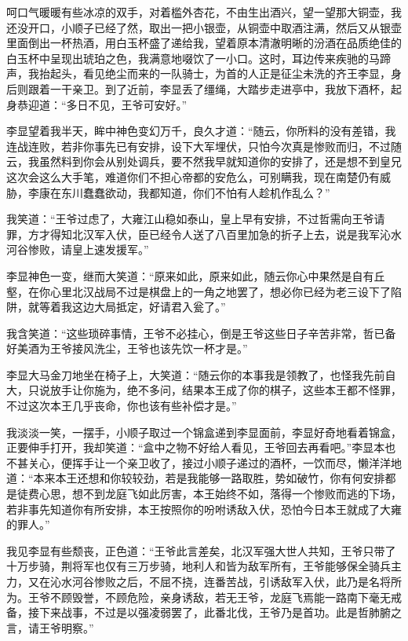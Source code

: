 呵口气暖暖有些冰凉的双手，对着槛外杏花，不由生出酒兴，望一望那大铜壶，我还没开口，小顺子已经了然，取出一把小银壶，从铜壶中取酒注满，然后又从银壶里面倒出一杯热酒，用白玉杯盛了递给我，望着原本清澈明晰的汾酒在品质绝佳的白玉杯中呈现出琥珀之色，我满意地啜饮了一小口。这时，耳边传来疾驰的马蹄声，我抬起头，看见绝尘而来的一队骑士，为首的人正是征尘未洗的齐王李显，身后则跟着一干亲卫。到了近前，李显丢了缰绳，大踏步走进亭中，我放下酒杯，起身恭迎道：“多日不见，王爷可安好。”

李显望着我半天，眸中神色变幻万千，良久才道：“随云，你所料的没有差错，我连战连败，若非你事先已有安排，设下大军埋伏，只怕今次真是惨败而归，不过随云，我虽然料到你会从别处调兵，要不然我早就知道你的安排了，还是想不到皇兄这次会这么大手笔，难道你们不担心帝都的安危么，可别瞒我，现在南楚仍有威胁，李康在东川蠢蠢欲动，我都知道，你们不怕有人趁机作乱么？”

我笑道：“王爷过虑了，大雍江山稳如泰山，皇上早有安排，不过哲需向王爷请罪，方才得知北汉军入伏，臣已经令人送了八百里加急的折子上去，说是我军沁水河谷惨败，请皇上速发援军。”

李显神色一变，继而大笑道：“原来如此，原来如此，随云你心中果然是自有丘壑，在你心里北汉战局不过是棋盘上的一角之地罢了，想必你已经为老三设下了陷阱，就等着我这边大局抵定，好请君入瓮了。”

我含笑道：“这些琐碎事情，王爷不必挂心，倒是王爷这些日子辛苦非常，哲已备好美酒为王爷接风洗尘，王爷也该先饮一杯才是。”

李显大马金刀地坐在椅子上，大笑道：“随云你的本事我是领教了，也怪我先前自大，只说放手让你施为，绝不多问，结果本王成了你的棋子，这些本王都不怪罪，不过这次本王几乎丧命，你也该有些补偿才是。”

我淡淡一笑，一摆手，小顺子取过一个锦盒递到李显面前，李显好奇地看着锦盒，正要伸手打开，我却笑道：“盒中之物不好给人看见，王爷回去再看吧。”李显本也不甚关心，便挥手让一个亲卫收了，接过小顺子递过的酒杯，一饮而尽，懒洋洋地道：“本来本王还想和你较较劲，若是我能够一路取胜，势如破竹，你有何安排都是徒费心思，想不到龙庭飞如此厉害，本王始终不如，落得一个惨败而逃的下场，若非事先知道你有所安排，本王按照你的吩咐诱敌入伏，恐怕今日本王就成了大雍的罪人。”

我见李显有些颓丧，正色道：“王爷此言差矣，北汉军强大世人共知，王爷只带了十万步骑，荆将军也仅有三万步骑，地利人和皆为敌军所有，王爷能够保全骑兵主力，又在沁水河谷惨败之后，不屈不挠，连番苦战，引诱敌军入伏，此乃是名将所为。王爷不顾毁誉，不顾危险，亲身诱敌，若无王爷，龙庭飞焉能一路南下毫无戒备，接下来战事，不过是以强凌弱罢了，此番北伐，王爷乃是首功。此是哲肺腑之言，请王爷明察。”

